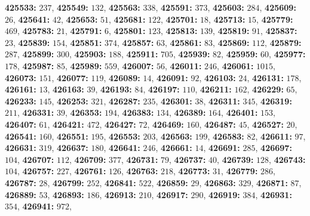 \textsf{\bfseries 425533:} $237$, \textsf{\bfseries 425549:} $132$, \textsf{\bfseries 425563:} $338$, \textsf{\bfseries 425591:} $373$, \textsf{\bfseries 425603:} $284$, \textsf{\bfseries 425609:} $26$, \textsf{\bfseries 425641:} $42$, \textsf{\bfseries 425653:} $51$, \textsf{\bfseries 425681:} $122$, \textsf{\bfseries 425701:} $18$, \textsf{\bfseries 425713:} $15$, \textsf{\bfseries 425779:} $469$, \textsf{\bfseries 425783:} $21$, \textsf{\bfseries 425791:} $6$, \textsf{\bfseries 425801:} $123$, \textsf{\bfseries 425813:} $139$, \textsf{\bfseries 425819:} $91$, \textsf{\bfseries 425837:} $23$, \textsf{\bfseries 425839:} $154$, \textsf{\bfseries 425851:} $374$, \textsf{\bfseries 425857:} $63$, \textsf{\bfseries 425861:} $83$, \textsf{\bfseries 425869:} $112$, \textsf{\bfseries 425879:} $287$, \textsf{\bfseries 425899:} $300$, \textsf{\bfseries 425903:} $188$, \textsf{\bfseries 425911:} $705$, \textsf{\bfseries 425939:} $82$, \textsf{\bfseries 425959:} $60$, \textsf{\bfseries 425977:} $178$, \textsf{\bfseries 425987:} $85$, \textsf{\bfseries 425989:} $559$, \textsf{\bfseries 426007:} $56$, \textsf{\bfseries 426011:} $246$, \textsf{\bfseries 426061:} $1015$, \textsf{\bfseries 426073:} $151$, \textsf{\bfseries 426077:} $119$, \textsf{\bfseries 426089:} $14$, \textsf{\bfseries 426091:} $92$, \textsf{\bfseries 426103:} $24$, \textsf{\bfseries 426131:} $178$, \textsf{\bfseries 426161:} $13$, \textsf{\bfseries 426163:} $39$, \textsf{\bfseries 426193:} $84$, \textsf{\bfseries 426197:} $110$, \textsf{\bfseries 426211:} $162$, \textsf{\bfseries 426229:} $65$, \textsf{\bfseries 426233:} $145$, \textsf{\bfseries 426253:} $321$, \textsf{\bfseries 426287:} $235$, \textsf{\bfseries 426301:} $38$, \textsf{\bfseries 426311:} $345$, \textsf{\bfseries 426319:} $211$, \textsf{\bfseries 426331:} $39$, \textsf{\bfseries 426353:} $194$, \textsf{\bfseries 426383:} $134$, \textsf{\bfseries 426389:} $164$, \textsf{\bfseries 426401:} $153$, \textsf{\bfseries 426407:} $61$, \textsf{\bfseries 426421:} $472$, \textsf{\bfseries 426427:} $72$, \textsf{\bfseries 426469:} $160$, \textsf{\bfseries 426487:} $45$, \textsf{\bfseries 426527:} $20$, \textsf{\bfseries 426541:} $160$, \textsf{\bfseries 426551:} $195$, \textsf{\bfseries 426553:} $203$, \textsf{\bfseries 426563:} $199$, \textsf{\bfseries 426583:} $82$, \textsf{\bfseries 426611:} $97$, \textsf{\bfseries 426631:} $319$, \textsf{\bfseries 426637:} $180$, \textsf{\bfseries 426641:} $246$, \textsf{\bfseries 426661:} $14$, \textsf{\bfseries 426691:} $285$, \textsf{\bfseries 426697:} $104$, \textsf{\bfseries 426707:} $112$, \textsf{\bfseries 426709:} $377$, \textsf{\bfseries 426731:} $79$, \textsf{\bfseries 426737:} $40$, \textsf{\bfseries 426739:} $128$, \textsf{\bfseries 426743:} $104$, \textsf{\bfseries 426757:} $227$, \textsf{\bfseries 426761:} $126$, \textsf{\bfseries 426763:} $218$, \textsf{\bfseries 426773:} $31$, \textsf{\bfseries 426779:} $286$, \textsf{\bfseries 426787:} $28$, \textsf{\bfseries 426799:} $252$, \textsf{\bfseries 426841:} $522$, \textsf{\bfseries 426859:} $29$, \textsf{\bfseries 426863:} $329$, \textsf{\bfseries 426871:} $87$, \textsf{\bfseries 426889:} $53$, \textsf{\bfseries 426893:} $186$, \textsf{\bfseries 426913:} $210$, \textsf{\bfseries 426917:} $290$, \textsf{\bfseries 426919:} $384$, \textsf{\bfseries 426931:} $354$, \textsf{\bfseries 426941:} $972$, 
